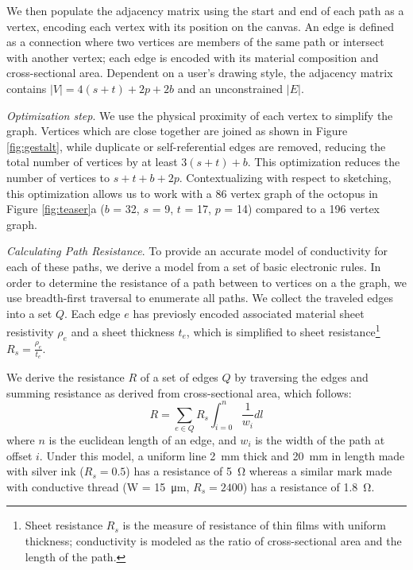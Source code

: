 \documentclass{sigchi}
\begin{document}
    We then populate the adjacency matrix using the start and end of each path as a vertex, encoding each vertex with its position on the canvas. An edge is defined as a connection where two vertices are members of the same path or intersect with another vertex; each edge is encoded with its material composition and cross-sectional area.
     Dependent on  a user's drawing style, the adjacency matrix contains $|V| = 4(s + t) + 2p + 2b $ and an unconstrained $|E|$.
 
    \textit{Optimization step}. We use the physical proximity of each vertex to simplify the graph. Vertices which are close together are joined as shown in Figure \ref{fig:gestalt}, while duplicate or self-referential edges are removed, reducing the total number of vertices by at least $3(s + t) + b$. This optimization reduces the number of vertices to $s + t + b + 2p$. Contextualizing with respect to sketching, this optimization allows us to work with a 86 vertex graph of the octopus in Figure \ref{fig:teaser}a ($b$ = 32, $s$ = 9, $t$ = 17, $p$ = 14) compared to a 196 vertex graph.

      
    \textit{Calculating Path Resistance}. To provide an accurate model of conductivity for each of these paths, we derive a model from a set of basic electronic rules. In order to determine the resistance of a path between to vertices on a the graph, we use breadth-first traversal to enumerate all paths.
    We collect the traveled edges into a set $Q$. 
    Each edge $e$ has previosly encoded associated material sheet resistivity $\rho_e$ and a sheet thickness $t_e$, which is simplified to sheet resistance\footnote{Sheet resistance $R_s$ is the measure of resistance of thin films with uniform thickness; conductivity is modeled as the ratio of cross-sectional area and the length of the path.} $R_s = \frac{\rho_e}{t_e}$.
    
    We derive the resistance $R$ of a set of edges $Q$ by traversing the edges and summing resistance as derived from cross-sectional area, which follows:
        \begin{equation}
            R =  \sum_{e \in Q} R_s \int_{i=0}^{n}  \frac{1}{w_i} dl
        \label{eq:resistance}
        \end{equation}
      where $n$ is the euclidean length of an edge, and $w_i$ is the width of the path at offset $i$. Under this model, a uniform line \SI{2}{\milli\metre} thick and \SI{20}{\milli\metre} in length made with silver ink ($R_s = 0.5$) has a resistance of \SI{5}{\ohm} whereas a similar mark made with conductive thread (W = \SI{15}{\micro\metre}, $R_s = 2400$) has a resistance of \SI{1.8}{\ohm}.
\end{document}
